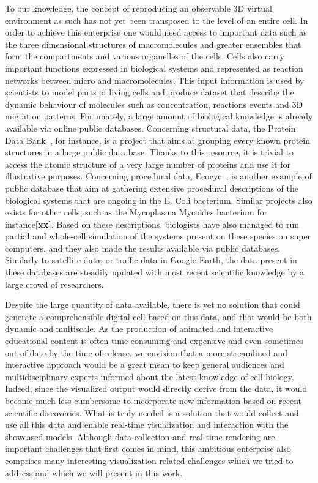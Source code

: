 To our knowledge, the concept of reproducing an observable 3D virtual environment as such has not yet been transposed to the level of an entire cell.
In order to achieve this enterprise one would need access to important data such as the three dimensional structures of macromolecules and greater ensembles that form the compartments and various organelles of the cells.
Cells also carry important functions expressed in biological systems and represented as reaction networks between micro and macromolecules.
This input information is used by scientists to model parts of living cells and produce dataset that describe the dynamic behaviour of molecules such as concentration, reactions events and 3D migration patterns.
Fortunately, a large amount of biological knowledge is already available via online public databases.
Concerning structural data, the Protein Data Bank~\cite{bernstein1977protein}, for instance, is a project that aims at grouping every known protein structures in a large public data base.
Thanks to this resource, it is trivial to access the atomic structure of a very large number of proteins and use it for illustrative purposes.
Concerning procedural data, Ecocyc~\cite{keseler2005ecocyc}, is another example of public database that aim at gathering extensive procedural descriptions of the biological systems that are ongoing in the E. Coli bacterium.
Similar projects also exists for other cells, such as the Mycoplasma Mycoides bacterium for instance\textbf{[xx]}.
Based on these descriptions, biologists have also managed to run partial and whole-cell simulation of the systems present on these species on super computers, and they also made the results available via public databases\cite{karr2014wholecellsimdb}.
Similarly to satellite data, or traffic data in Google Earth, the data present in these databases are steadily updated with most recent scientific knowledge by a large crowd of researchers.

Despite the large quantity of data available, there is yet no solution that could generate a comprehensible digital cell based on this data, and that would be both dynamic and multiscale.
As the production of animated and interactive educational content is often time consuming and expensive and even sometimes out-of-date by the time of release, we envision that a more streamlined and interactive approach would be a great mean to keep general audiences and multidisciplinary experts informed about the latest knowledge of cell biology.
Indeed, since the visualized output would directly derive from the data, it would become much less cumbersome to incorporate new information based on recent scientific discoveries.
What is truly needed is a solution that would collect and use all this data and enable real-time visualization and interaction with the showcased models. 
Although data-collection and real-time rendering are important challenges that first comes in mind, this ambitious enterprise also comprises many interesting visualization-related challenges which we tried to address and which we will present in this work.

